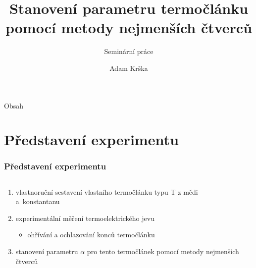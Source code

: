 \documentclass[smaller,aspectratio=1610,handout]{beamer}
\author[A. Krška]{Adam Krška}
\title[Stanovení parametru termočlánku]{Stanovení parametru termočlánku pomocí
metody nejmenších čtverců}
\subtitle{Seminární práce}
\institute[GSS Mikulov]{Gymnázium a střední odborná škola Mikulov}
\date{}
\begin{document}
\frame[plain]{\titlepage}

\begin{frame}[plain]{Obsah}
	\tableofcontents
\end{frame}


\section{Představení experimentu}
\begin{frame}
	\frametitle{Představení experimentu}
	\begin{columns}
		\begin{column}{0.5\textwidth}
			\begin{enumerate}
				\item vlastnoruční sestavení vlastního termočlánku typu T z mědi a~konstantanu
				\item experimentální měření termoelektrického jevu
					\begin{itemize}
						\item ohřívání a ochlazování konců termočlánku
					\end{itemize}
				\item stanovení parametru $\alpha$ pro tento termočlánek pomocí
					metody nejmenších čtverců
			\end{enumerate}
		\end{column}
		\begin{column}{0.5\textwidth}
		\end{column}
	\end{columns}
\end{frame}
\end{document}
